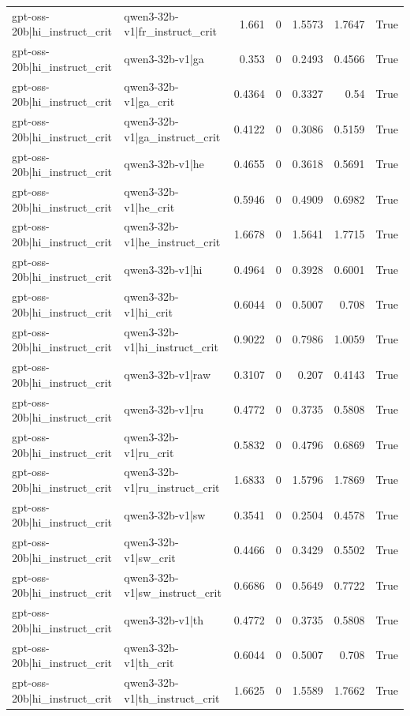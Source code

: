 \begin{table}
\begin{tabular}{l l r r r r l}
gpt-oss-20b|hi_instruct_crit & qwen3-32b-v1|fr_instruct_crit & 1.661 & 0 & 1.5573 & 1.7647 & True \\
gpt-oss-20b|hi_instruct_crit & qwen3-32b-v1|ga & 0.353 & 0 & 0.2493 & 0.4566 & True \\
gpt-oss-20b|hi_instruct_crit & qwen3-32b-v1|ga_crit & 0.4364 & 0 & 0.3327 & 0.54 & True \\
gpt-oss-20b|hi_instruct_crit & qwen3-32b-v1|ga_instruct_crit & 0.4122 & 0 & 0.3086 & 0.5159 & True \\
gpt-oss-20b|hi_instruct_crit & qwen3-32b-v1|he & 0.4655 & 0 & 0.3618 & 0.5691 & True \\
gpt-oss-20b|hi_instruct_crit & qwen3-32b-v1|he_crit & 0.5946 & 0 & 0.4909 & 0.6982 & True \\
gpt-oss-20b|hi_instruct_crit & qwen3-32b-v1|he_instruct_crit & 1.6678 & 0 & 1.5641 & 1.7715 & True \\
gpt-oss-20b|hi_instruct_crit & qwen3-32b-v1|hi & 0.4964 & 0 & 0.3928 & 0.6001 & True \\
gpt-oss-20b|hi_instruct_crit & qwen3-32b-v1|hi_crit & 0.6044 & 0 & 0.5007 & 0.708 & True \\
gpt-oss-20b|hi_instruct_crit & qwen3-32b-v1|hi_instruct_crit & 0.9022 & 0 & 0.7986 & 1.0059 & True \\
gpt-oss-20b|hi_instruct_crit & qwen3-32b-v1|raw & 0.3107 & 0 & 0.207 & 0.4143 & True \\
gpt-oss-20b|hi_instruct_crit & qwen3-32b-v1|ru & 0.4772 & 0 & 0.3735 & 0.5808 & True \\
gpt-oss-20b|hi_instruct_crit & qwen3-32b-v1|ru_crit & 0.5832 & 0 & 0.4796 & 0.6869 & True \\
gpt-oss-20b|hi_instruct_crit & qwen3-32b-v1|ru_instruct_crit & 1.6833 & 0 & 1.5796 & 1.7869 & True \\
gpt-oss-20b|hi_instruct_crit & qwen3-32b-v1|sw & 0.3541 & 0 & 0.2504 & 0.4578 & True \\
gpt-oss-20b|hi_instruct_crit & qwen3-32b-v1|sw_crit & 0.4466 & 0 & 0.3429 & 0.5502 & True \\
gpt-oss-20b|hi_instruct_crit & qwen3-32b-v1|sw_instruct_crit & 0.6686 & 0 & 0.5649 & 0.7722 & True \\
gpt-oss-20b|hi_instruct_crit & qwen3-32b-v1|th & 0.4772 & 0 & 0.3735 & 0.5808 & True \\
gpt-oss-20b|hi_instruct_crit & qwen3-32b-v1|th_crit & 0.6044 & 0 & 0.5007 & 0.708 & True \\
gpt-oss-20b|hi_instruct_crit & qwen3-32b-v1|th_instruct_crit & 1.6625 & 0 & 1.5589 & 1.7662 & True \\

\end{tabular}
\end{table}
